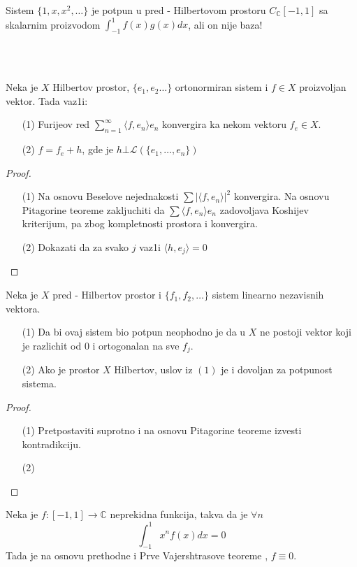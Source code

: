 \documentclass[a4paper,12pt]{article}
\newcommand{\CC}{\mathbb{C}}
\begin{document}
\begin{pr}
Sistem $\{1,x,x^2, \dots \}$ je potpun u pred - Hilbertovom prostoru $C_{\CC}[-1,1]$ sa skalarnim proizvodom $\int_{-1}^1 f(x) g(x) dx$, ali on nije baza!
\end{pr}
\\ \\
\begin{tma}
Neka je $X$ Hilbertov prostor, $\{e_1, e_2 \dots \}$ ortonormiran sistem i $f \in X$ proizvoljan vektor. Tada vaz1i:
\begin{itemize}
\item[(1)] Furijeov red $\sum_{n=1}^{\infty} \langle f, e_n \rangle e_n$ konvergira ka nekom vektoru $f_e \in X$.
\item[(2)] $f = f_e + h$, gde je $h \bot \mathcal{L}(\{e_1, \dots, e_n \})$
\end{itemize}
\end{tma}
\begin{proof}
\begin{itemize}
\item[(1)] Na osnovu Beselove nejednakosti $\sum {|\langle f, e_n \rangle |}^2$ konvergira. Na osnovu Pita\-go\-ri\-ne teoreme zakljuchiti da $\sum \langle f, e_n \rangle e_n $ zadovoljava Koshijev kriterijum, pa zbog kom\-ple\-tno\-sti prostora i konvergira.
\item[(2)] Dokazati da za svako $j$ vaz1i $\langle h, e_j \rangle = 0$
\end{itemize}
\end{proof}

\begin{tma}
Neka je $X$ pred - Hilbertov prostor i $\{f_1, f_2, \dots\}$ sistem linearno nezavisnih vektora.
\begin{itemize}
\item[(1)] Da bi ovaj sistem bio potpun neophodno je da u $X$ ne postoji vektor koji je razlichit od $0$ i ortogonalan na sve $f_j$.
\item[(2)] Ako je prostor $X$ Hilbertov, uslov iz $(1)$ je i dovoljan za potpunost sistema.
\end{itemize}
\end{tma}
\begin{proof}
\begin{itemize}
\item[(1)] Pretpostaviti suprotno i na osnovu Pitagorine teoreme izvesti kon\-tra\-dik\-ci\-ju.
\item[(2)] 
\end{itemize}
\end{proof}

\begin{pr}
Neka je $f:[-1,1] \to \CC$ neprekidna funkcija, takva da je $\forall n$ 
\[\int_{-1}^1 x^n f(x) dx = 0\]
Tada je na osnovu prethodne i Prve Vajershtrasove teoreme , $f\equiv 0$.
\end{pr}
\end{document}
